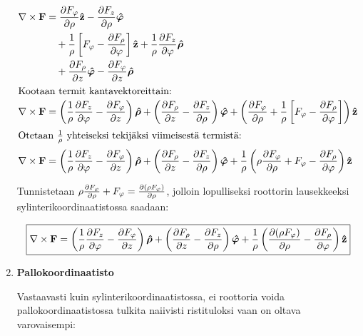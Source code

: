 \documentclass[../johdoksia.tex]{subfiles}
\begin{document}
\begin{enumerate}
\begin{align}
			\nabla\times\mathbf{F} &= \pdv{F_\varphi}{\rho}\mathbf{\hat{z}} - \pdv{F_z}{\rho}\boldsymbol{\hat{\varphi}} \\
			&\quad + \frac{1}{\rho}\left[F_\varphi - \pdv{F_\rho}{\varphi}\right]\mathbf{\hat{z}} + \frac{1}{\rho}\pdv{F_z}{\varphi}\boldsymbol{\hat{\rho}} \\
			&\quad + \pdv{F_\rho}{z}\boldsymbol{\hat{\varphi}} - \pdv{F_\varphi}{z}\boldsymbol{\hat{\rho}} \\
			\intertext{Kootaan termit kantavektoreittain:}
			\nabla\times\mathbf{F} &= \left(\frac{1}{\rho}\pdv{F_z}{\varphi} - \pdv{F_\varphi}{z}\right)\boldsymbol{\hat{\rho}} + \left(\pdv{F_\rho}{z} - \pdv{F_z}{\rho}\right)\boldsymbol{\hat{\varphi}} + \left(\pdv{F_\varphi}{\rho}  + \frac{1}{\rho}\left[F_\varphi - \pdv{F_\rho}{\varphi}\right]\right)\mathbf{\hat{z}} \\
			\intertext{Otetaan $\frac{1}{\rho}$ yhteiseksi tekijäksi viimeisestä termistä:}
			\nabla\times\mathbf{F} &= \left(\frac{1}{\rho}\pdv{F_z}{\varphi} - \pdv{F_\varphi}{z}\right)\boldsymbol{\hat{\rho}} + \left(\pdv{F_\rho}{z} - \pdv{F_z}{\rho}\right)\boldsymbol{\hat{\varphi}} + \frac{1}{\rho}\left(\rho\pdv{F_\varphi}{\rho} + F_\varphi - \pdv{F_\rho}{\varphi}\right)\mathbf{\hat{z}}
		\end{align}
		
		\noindent Tunnistetaan $\rho\pdv{F_\varphi}{\rho} + F_\varphi = \pdv{(\rho F_\varphi)}{\rho}$, jolloin lopulliseksi roottorin lausekkeeksi sylinterikoordinaatistossa saadaan:
		
		\begin{equation}
			\boxed{\nabla\times\mathbf{F} = \left(\frac{1}{\rho}\pdv{F_z}{\varphi} - \pdv{F_\varphi}{z}\right)\boldsymbol{\hat{\rho}} + \left(\pdv{F_\rho}{z} - \pdv{F_z}{\rho}\right)\boldsymbol{\hat{\varphi}} + \frac{1}{\rho}\left(\pdv{(\rho F_\varphi)}{\rho} - \pdv{F_\rho}{\varphi}\right)\mathbf{\hat{z}}}
		\end{equation}
		
		\item \textbf{Pallokoordinaatisto}
		
		Vastaavasti kuin sylinterikoordinaatistossa, ei roottoria voida pallokoordinaatistossa tulkita naiivisti ristituloksi vaan on oltava varovaisempi:
		

\end{enumerate}
\end{document}
